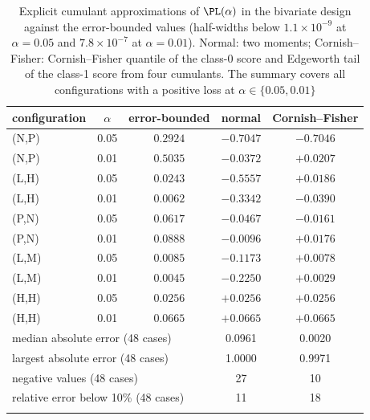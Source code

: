 \begin{table}[t]
\caption{Explicit cumulant approximations of $\PL(\alpha)$ in the bivariate design against the error-bounded values (half-widths below $1.1\times10^{-9}$ at $\alpha=0.05$ and $7.8\times10^{-7}$ at $\alpha=0.01$). Normal: two moments; Cornish--Fisher: Cornish--Fisher quantile of the class-0 score and Edgeworth tail of the class-1 score from four cumulants. The summary covers all configurations with a positive loss at $\alpha\in\{0.05,0.01\}$}\label{tab:explicit}
\small
\begin{tabular*}{\textwidth}{@{\extracolsep\fill}lcccc@{}}
\toprule
configuration & $\alpha$ & error-bounded & normal & Cornish--Fisher\\
\midrule
(N,P) & 0.05 & $0.2924$ & $-0.7047$ & $-0.7046$\\
(N,P) & 0.01 & $0.5035$ & $-0.0372$ & $+0.0207$\\
(L,H) & 0.05 & $0.0243$ & $-0.5557$ & $+0.0186$\\
(L,H) & 0.01 & $0.0062$ & $-0.3342$ & $-0.0390$\\
(P,N) & 0.05 & $0.0617$ & $-0.0467$ & $-0.0161$\\
(P,N) & 0.01 & $0.0888$ & $-0.0096$ & $+0.0176$\\
(L,M) & 0.05 & $0.0085$ & $-0.1173$ & $+0.0078$\\
(L,M) & 0.01 & $0.0045$ & $-0.2250$ & $+0.0029$\\
(H,H) & 0.05 & $0.0256$ & $+0.0256$ & $+0.0256$\\
(H,H) & 0.01 & $0.0665$ & $+0.0665$ & $+0.0665$\\
\midrule
\multicolumn{3}{l}{median absolute error (48 cases)} & 0.0961 & 0.0020\\
\multicolumn{3}{l}{largest absolute error (48 cases)} & 1.0000 & 0.9971\\
\multicolumn{3}{l}{negative values (48 cases)} & 27 & 10\\
\multicolumn{3}{l}{relative error below 10\% (48 cases)} & 11 & 18\\
\botrule
\end{tabular*}
\end{table}
